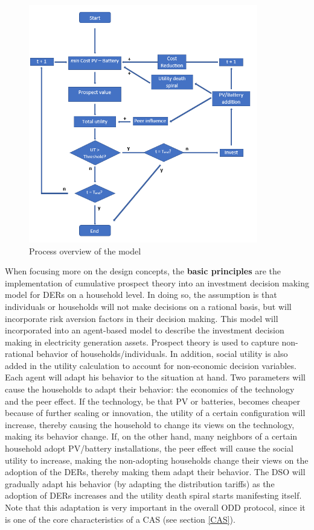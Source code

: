 \begin{figure}[h!]
    \centering
    \includegraphics[width=10cm]{flowchart.PNG}
    \caption{Process overview of the model}
    \label{fig:flow}
\end{figure}
\noindent
When focusing more on the design concepts, the \textbf{basic principles} are the implementation of cumulative prospect theory into an investment decision making model for DERs on a household level. In doing so, the assumption is that individuals or households will not make decisions on a rational basis, but will incorporate risk aversion factors in their decision making. This model will incorporated into an agent-based model to describe the investment decision making in electricity generation assets. Prospect theory is used to capture non-rational behavior of households/individuals. In addition, social utility is also added in the utility calculation to account for non-economic decision variables. 
\newline \newline \noindent
Each agent will adapt his behavior to the situation at hand. Two parameters will cause the households to adapt their behavior: the economics of the technology and the peer effect. If the technology, be that PV or batteries, becomes cheaper because of further scaling or innovation, the utility of a certain configuration will increase, thereby causing the household to change its views on the technology, making its behavior change. If, on the other hand, many neighbors of a certain household adopt PV/battery installations, the peer effect will cause the social utility to increase, making the non-adopting households change their views on the adoption of the DERs, thereby making them adapt their behavior. The DSO will gradually adapt his behavior (by adapting the distribution tariffs) as the adoption of DERs increases and the utility death spiral starts manifesting itself. Note that this adaptation is very important in the overall ODD protocol, since it is one of the core characteristics of a CAS (see section \ref{CAS}). 

